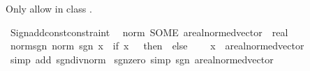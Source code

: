 \begin{isabellebody}
\endisatagML
{\isafoldML}%
%
\isadelimML
%
\endisadelimML
%
\begin{isamarkuptext}%
Only allow  in class .%
\end{isamarkuptext}\isamarkuptrue%
%
\isadelimML
%
\endisadelimML
%
\isatagML
{}\isamarkupfalse%
\ {\isacartoucheopen}Sign{\isachardot}{\kern0pt}add{\isacharunderscore}{\kern0pt}const{\isacharunderscore}{\kern0pt}constraint\isanewline
\ \ {\isacharparenleft}{\kern0pt}\isactrlconstUNDERSCOREname {\isasymopen}norm{\isasymclose}{\isacharcomma}{\kern0pt}\ SOME\ \isactrltyp {\isasymopen}{\isacharprime}{\kern0pt}a{\isacharcolon}{\kern0pt}{\isacharcolon}{\kern0pt}real{\isacharunderscore}{\kern0pt}normed{\isacharunderscore}{\kern0pt}vector\ {\isasymRightarrow}\ real{\isasymclose}{\isacharparenright}{\kern0pt}{\isacartoucheclose}%
\endisatagML
{\isafoldML}%
%
\isadelimML
%
\endisadelimML
%
\isadelimdocument
%
\endisadelimdocument
%
\isatagdocument
%
\isamarkuptrue%
%
\endisatagdocument
{\isafolddocument}%
%
\isadelimdocument
%
\endisadelimdocument
{}\isamarkupfalse%
\ norm{\isacharunderscore}{\kern0pt}sgn{\isacharcolon}{\kern0pt}\ {\isachardoublequoteopen}norm\ {\isacharparenleft}{\kern0pt}sgn\ x{\isacharparenright}{\kern0pt}\ {\isacharequal}{\kern0pt}\ {\isacharparenleft}{\kern0pt}if\ x\ {\isacharequal}{\kern0pt}\ {}\ then\ {}\ else\ {}{\isacharparenright}{\kern0pt}{\isachardoublequoteclose}\isanewline
\ \ \ x\ {\isacharcolon}{\kern0pt}{\isacharcolon}{\kern0pt}\ {\isachardoublequoteopen}{\isacharprime}{\kern0pt}a{\isacharcolon}{\kern0pt}{\isacharcolon}{\kern0pt}real{\isacharunderscore}{\kern0pt}normed{\isacharunderscore}{\kern0pt}vector{\isachardoublequoteclose}\isanewline
%
\isadelimproof
\ \ %
\endisadelimproof
%
\isatagproof
{}\isamarkupfalse%
\ {\isacharparenleft}{\kern0pt}simp\ add{\isacharcolon}{\kern0pt}\ sgn{\isacharunderscore}{\kern0pt}div{\isacharunderscore}{\kern0pt}norm{\isacharparenright}{\kern0pt}%
\endisatagproof
{\isafoldproof}%
%
\isadelimproof
\isanewline
%
\endisadelimproof
\isanewline
{}\isamarkupfalse%
\ sgn{\isacharunderscore}{\kern0pt}zero\ {\isacharbrackleft}{\kern0pt}simp{\isacharbrackright}{\kern0pt}{\isacharcolon}{\kern0pt}\ {\isachardoublequoteopen}sgn\ {\isacharparenleft}{\kern0pt}{}{\isacharcolon}{\kern0pt}{\isacharcolon}{\kern0pt}{\isacharprime}{\kern0pt}a{\isacharcolon}{\kern0pt}{\isacharcolon}{\kern0pt}real{\isacharunderscore}{\kern0pt}normed{\isacharunderscore}{\kern0pt}vector{\isacharparenright}{\kern0pt}\ {\isacharequal}{\kern0pt}\ {}{\isachardoublequoteclose}\isanewline

\end{isabellebody}
